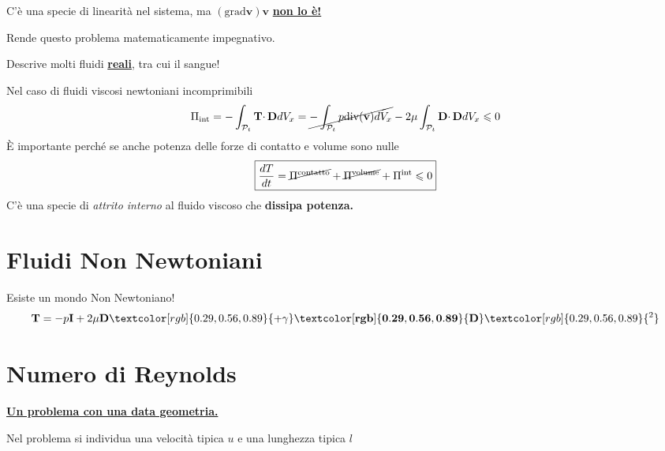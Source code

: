 \documentclass[10pt,a4paper,twoside]{book}
\begin{document}
C'è una specie di linearità nel sistema, ma $(\mathrm{grad}\mathbf{v})\mathbf{v}$ \underline{\textbf{non lo è!}}

Rende questo problema matematicamente impegnativo.

Descrive molti fluidi \underline{\textbf{reali}}, tra cui il sangue!
\begin{oss}
Nel caso di fluidi viscosi newtoniani incomprimibili
\begin{equation*}
\Pi _{\text{int}} =-\int _{\mathcal{P}_{t}}\mathbf{T} \cdotp \mathbf{D} dV_{x} =\cancel{-\int _{\mathcal{P}_{t}} p\mathrm{div}(\mathbf{v}) dV_{x}} -2\mu \int _{\mathcal{P}_{t}}\mathbf{D} \cdotp \mathbf{D} dV_{x} \leqslant 0
\end{equation*}
È importante perché se anche potenza delle forze di contatto e volume sono nulle
\begin{equation*}
\boxed{\frac{dT}{dt} =\cancel{\Pi ^{\text{contatto}}} +\cancel{\Pi ^{\text{volume}}} +\Pi ^{\text{int}} \leqslant 0}
\end{equation*}
C'è una specie di \textit{attrito interno} al fluido viscoso che \textbf{dissipa potenza.}
\end{oss}
\section{Fluidi Non Newtoniani}

Esiste un mondo Non Newtoniano!
\begin{equation*}
\mathbf{T} =-p\mathbf{I} +2\mu \mathbf{D}\textcolor[rgb]{0.29,0.56,0.89}{+\gamma }\mathbf{\textcolor[rgb]{0.29,0.56,0.89}{D}}\textcolor[rgb]{0.29,0.56,0.89}{^{2}}
\end{equation*}
\section{Numero di Reynolds}

\underline{\textbf{Un problema con una data geometria.}}

Nel problema si individua una velocità tipica $u$ e una lunghezza tipica $l$

\end{document}
